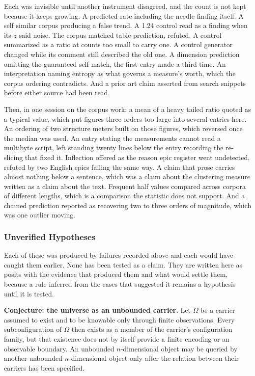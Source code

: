 Each was invisible until another instrument disagreed, and the count is not kept because it keeps growing. A predicted rate including the needle finding itself. A self similar corpus producing a false trend. A 1.24 control read as a finding when its \(z\) said noise. The corpus matched table prediction, refuted. A control summarized as a ratio at counts too small to carry one. A control generator changed while its comment still described the old one. A dimension prediction omitting the guaranteed self match, the first entry made a third time. An interpretation naming entropy as what governs a measure's worth, which the corpus ordering contradicts. And a prior art claim asserted from search snippets before either source had been read.

Then, in one session on the corpus work: a mean of a heavy tailed ratio quoted as a typical value, which put figures three orders too large into several entries here. An ordering of two structure meters built on those figures, which reversed once the median was used. An entry stating the measurements cannot read a multibyte script, left standing twenty lines below the entry recording the re-slicing that fixed it. Inflection offered as the reason epic register went undetected, refuted by two English epics failing the same way. A claim that prose carries almost nothing below a sentence, which was a claim about the clustering measure written as a claim about the text. Frequent half values compared across corpora of different lengths, which is a comparison the statistic does not support. And a chained prediction reported as recovering two to three orders of magnitude, which was one outlier moving.

\subsubsection{Unverified Hypotheses}

Each of these was produced by failures recorded above and each would have caught them earlier. None has been tested as a claim. They are written here as posits with the evidence that produced them and what would settle them, because a rule inferred from the cases that suggested it remains a hypothesis until it is tested.

\textbf{Conjecture: the universe as an unbounded carrier.} Let \(\Omega\) be a carrier assumed to exist and to be knowable only through finite observations. Every subconfiguration of \(\Omega\) then exists as a member of the carrier's configuration family, but that existence does not by itself provide a finite encoding or an observable boundary. An unbounded \(n\)-dimensional object may be queried by another unbounded \(n\)-dimensional object only after the relation between their carriers has been specified.

